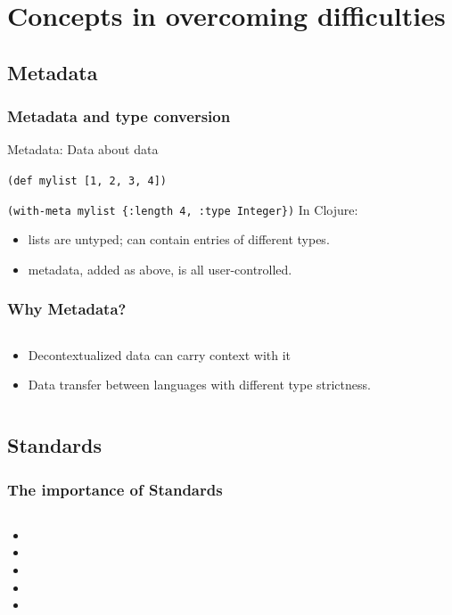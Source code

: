 \documentclass{beamer}
\newcommand{\linespace}{\vskip 0.25cm}
\begin{document}
\section[Handling interop]{Concepts in overcoming difficulties}

\subsection{Metadata}

\begin{frame}
  \frametitle{Metadata and type conversion}

	Metadata: Data about data
	
	{\tt (def mylist [1, 2, 3, 4])}
	
	{\tt (with-meta mylist \{:length 4, :type Integer\})}
	\linespace
	In Clojure:
	\begin{itemize}
	\item lists are untyped; can contain entries of different types.
	\item metadata, added as above, is all user-controlled.
	\end{itemize}
\end{frame}

\begin{frame}
    \frametitle{Why Metadata?}
  \begin{columns}
  \begin{column}{0.6\textwidth}

    \begin{itemize}   
    \item Decontextualized data can carry context with it
    \item Data transfer between languages with different type strictness.
    \end{itemize}
  \end{column}
  \begin{column}{0.6\textwidth}
  
  \end{column}
  
  \end{columns}
\end{frame}

\subsection{Standards}

\begin{frame}
  \frametitle{The importance of Standards}
  
  \begin{columns}
  \begin{column}{0.6\textwidth}
  \begin{itemize}
  	\item 
	\item 
	\item 
	\item 
	\item 
  \end{itemize}
  \end{column}
  \end{columns}
\end{frame}
\end{document}

